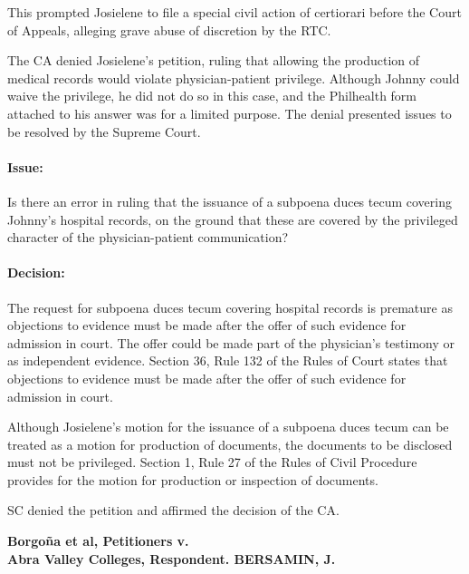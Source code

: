 \documentclass[
12pt,
oneside,
onehalfspacing,
headsepline
]{DigestCollection}
\begin{document}
This prompted Josielene to file a special civil action of certiorari before the Court of Appeals, alleging grave abuse of discretion by the RTC.

The CA denied Josielene's petition, ruling that allowing the production of medical records would violate physician-patient privilege. Although Johnny could waive the privilege, he did not do so in this case, and the Philhealth form attached to his answer was for a limited purpose. The denial presented issues to be resolved by the Supreme Court.

\paragraph{Issue:}
\label{1b9aaec0-09fe-11ef-932c-63c852f65e48}


Is there an error in ruling that the issuance of a subpoena duces tecum covering Johnny’s hospital records, on the ground that these are covered by the privileged character of the physician-patient communication?

\paragraph{Decision:}
\label{268392d0-0a16-11ef-932c-63c852f65e48}


The request for subpoena duces tecum covering hospital records is premature as objections to evidence must be made after the offer of such evidence for admission in court. The offer could be made part of the physician’s testimony or as independent evidence. Section 36, Rule 132 of the Rules of Court states that objections to evidence must be made after the offer of such evidence for admission in court.

Although Josielene's motion for the issuance of a subpoena duces tecum can be treated as a motion for production of documents, the documents to be disclosed must not be privileged. Section 1, Rule 27 of the Rules of Civil Procedure provides for the motion for production or inspection of documents.

SC denied the petition and affirmed the decision of the CA.

\label{93d651c0-0f88-11ef-8297-edd1c0998860}


\noindent\textbf{Borgoña et al, Petitioners v. \\Abra Valley Colleges, Respondent. BERSAMIN, J.}\vspace{0.4cm}
\end{document}
